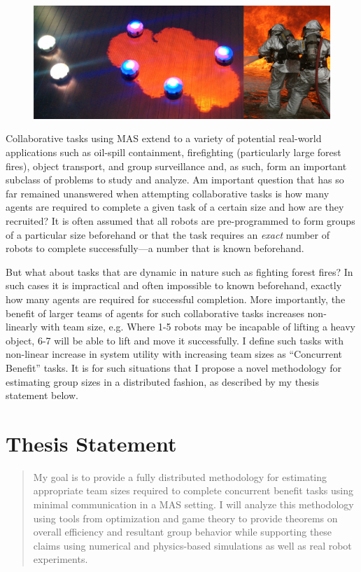 \documentclass[11pt, onecolumn, compsoc, letterpaper]{article}
\begin{document}
\begin{figure}[!htb]
	\centering\includegraphics[width=\textwidth]{../assets/dropletfire.png}
	\centering\caption{}\label{fig:dropletfire}
\end{figure}

Collaborative tasks using MAS extend to a variety of potential real-world applications such as oil-spill containment, firefighting (particularly large forest fires), object transport, and group surveillance and, as such, form an important subclass of problems to study and analyze. Am important question that has so far remained unanswered when attempting collaborative tasks is how many agents are required to complete a given task of a certain size and how are they recruited? It is often assumed that all robots are pre-programmed to form groups of a particular size beforehand or that the task requires an \emph{exact} number of robots to complete successfully---a number that is known beforehand. 

But what about tasks that are dynamic in nature such as fighting forest fires? In such cases it is impractical and often impossible to known beforehand, exactly how many agents are required for successful completion. More importantly, the benefit of larger teams of agents for such collaborative tasks increases non-linearly with team size, e.g. Where 1-5 robots may be incapable of lifting a heavy object, 6-7 will be able to lift and move it successfully. I define such tasks with non-linear increase in system utility with increasing team sizes as ``Concurrent Benefit'' tasks. It is for such situations that I propose a novel methodology for estimating group sizes in a distributed fashion, as described by my thesis statement below.

\section{Thesis Statement}
\begin{quote}
My goal is to provide a fully distributed methodology for estimating appropriate team sizes required to complete concurrent benefit tasks using minimal communication in a MAS setting. I will analyze this methodology using tools from optimization and game theory to provide theorems on overall efficiency and resultant group behavior while supporting these claims using numerical and physics-based simulations as well as real robot experiments.
\end{quote}
\end{document}
